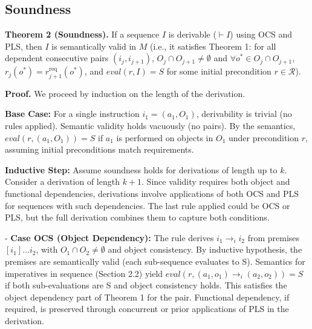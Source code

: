 \documentclass[a4paper,11pt]{lmcs}
\begin{document}
\subsection{Soundness}

\textbf{Theorem 2 (Soundness).} If a sequence \( I \) is derivable (\( \vdash I \)) using OCS and PLS, then \( I \) is semantically valid in \( M \) (i.e., it satisfies Theorem 1: for all dependent consecutive pairs \( (i_j, i_{j+1}) \), \( O_j \cap O_{j+1} \neq \emptyset \) and \( \forall o^* \in O_j \cap O_{j+1} \), \( r_j(o^*) = r_{j+1}^{\text{req}}(o^*) \), and \( \textit{eval}(r, I) = S \) for some initial precondition \( r \in \mathcal{R} \)).

\textbf{Proof.} We proceed by induction on the length of the derivation.

\textbf{Base Case:} For a single instruction \( i_1 = (a_1, O_1) \), derivability is trivial (no rules applied). Semantic validity holds vacuously (no pairs). By the semantics, \( \textit{eval}(r, (a_1, O_1)) = S \) if \( a_1 \) is performed on objects in \( O_1 \) under precondition \( r \), assuming initial preconditions match requirements.

\textbf{Inductive Step:} Assume soundness holds for derivations of length up to \( k \). Consider a derivation of length \( k+1 \). Since validity requires both object and functional dependencies, derivations involve applications of both OCS and PLS for sequences with such dependencies. The last rule applied could be OCS or PLS, but the full derivation combines them to capture both conditions.

- \textbf{Case OCS (Object Dependency):} The rule derives \( i_1 \rightarrow_i i_2 \) from premises \( [i_1] \dots i_2 \), with \( O_1 \cap O_2 \neq \emptyset \) and object consistency. By inductive hypothesis, the premises are semantically valid (each sub-sequence evaluates to S). Semantics for imperatives in sequence (Section 2.2) yield \( \textit{eval}(r, (a_1, o_1) \rightarrow_i (a_2, o_2)) = S \) if both sub-evaluations are S and object consistency holds. This satisfies the object dependency part of Theorem 1 for the pair. Functional dependency, if required, is preserved through concurrent or prior applications of PLS in the derivation.
\end{document}
